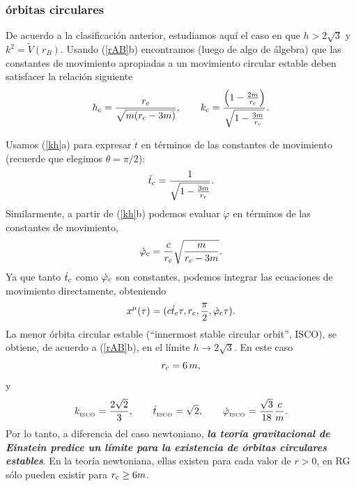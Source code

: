 \subsubsection{órbitas circulares}
De acuerdo a la clasificación anterior, estudiamos aquí el caso en que $h>2\sqrt{3}$ y $k^2=\tilde{V}(r_B)$. Usando (\ref{rAB}b) encontramos (luego de algo de álgebra) que las constantes de movimiento apropiadas a un movimiento circular estable deben satisfacer la relación siguiente
\begin{equation}
h_{\rm c}=\frac{r_{\rm c}}{\sqrt{m(r_{\rm c}-3m)}}, \qquad  k_{\rm c}=\frac{\left(1-\frac{2m}{r_{\rm c}}\right)}{\sqrt{1-\frac{3m}{r_{\rm c}}}}.
\end{equation}

Usamos (\ref{kh}a)  para expresar $\dot{t}$ en términos de las constantes de movimiento (recuerde que elegimos $\theta=\pi/2$):
\begin{equation}
 \dot{t}_{\rm c}=\frac{1}{\sqrt{1-\frac{3m}{r_{\rm c}}}}.
\end{equation}
Similarmente, a partir de (\ref{kh}b) podemos evaluar $\dot\varphi$ en términos de las constantes de movimiento,
\begin{equation}
 \dot\varphi_{\rm c}=\frac{c}{r_{\rm c}}\sqrt{\frac{m}{r_{\rm c}-3m}}.
\end{equation}
Ya que tanto $ \dot{t}_{\rm c}$ como $ \dot\varphi_{\rm c}$ son constantes, podemos integrar las ecuaciones de movimiento directamente, obteniendo
\begin{equation}
 x^\mu(\tau)=(c\dot{t}_{\rm c}\tau,r_{\rm c},\frac{\pi}{2}, \dot\varphi_{\rm c}\tau).
\end{equation}
La menor órbita circular estable (``innermost stable circular orbit'', ISCO), se obtiene, de acuerdo a (\ref{rAB}b), en el límite $h\to 2\sqrt{3}$. En este caso
\begin{equation}
 r_{\rm c}=6\,m,
\end{equation}
y
\begin{equation}
 k_{_{\rm ISCO}}= \frac{2\sqrt{2}}{3}, \qquad \dot{t}_{_{\rm ISCO}}=\sqrt{2}, \qquad \dot\varphi_{_{\rm ISCO}}=\frac{\sqrt{3}}{18}\frac{c}{m}.
\end{equation}
Por lo tanto, a diferencia del caso newtoniano, \textbf{\textit{la teoría gravitacional de Einstein predice un límite para la existencia de órbitas circulares estables}}. En la teoría newtoniana, ellas existen para cada valor de $r>0$, en RG sólo pueden existir para $r_{\rm c}\ge6m$.

